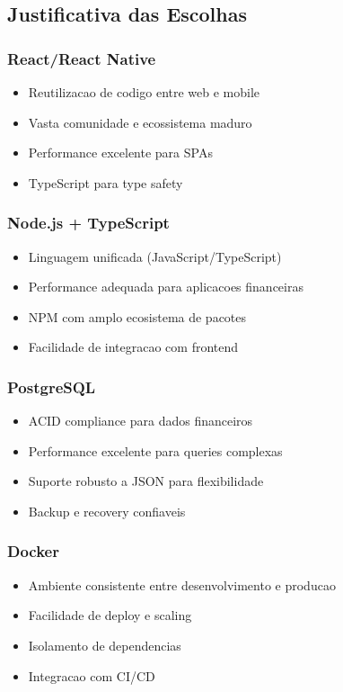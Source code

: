 \subsection{Justificativa das Escolhas}

\subsubsection{React/React Native}
\begin{itemize}
    \item Reutilizacao de codigo entre web e mobile
    \item Vasta comunidade e ecossistema maduro
    \item Performance excelente para SPAs
    \item TypeScript para type safety
\end{itemize}

\subsubsection{Node.js + TypeScript}
\begin{itemize}
    \item Linguagem unificada (JavaScript/TypeScript)
    \item Performance adequada para aplicacoes financeiras
    \item NPM com amplo ecosistema de pacotes
    \item Facilidade de integracao com frontend
\end{itemize}

\subsubsection{PostgreSQL}
\begin{itemize}
    \item ACID compliance para dados financeiros
    \item Performance excelente para queries complexas
    \item Suporte robusto a JSON para flexibilidade
    \item Backup e recovery confiaveis
\end{itemize}

\subsubsection{Docker}
\begin{itemize}
    \item Ambiente consistente entre desenvolvimento e producao
    \item Facilidade de deploy e scaling
    \item Isolamento de dependencias
    \item Integracao com CI/CD
\end{itemize}
